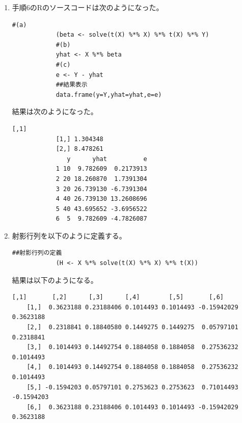 \documentclass[12pt]{jarticle}
\begin{document}
\begin{enumerate}
\begin{lstlisting}[style = lstR]
            #(c)
            xSSD <- sum((X[,2]-xbar)^2)
            #(d)
            ySSD <- sum((Y-ybar)^2)
            ##結果表示
            data.frame(x.SSD = xSSD, y.SSD = ySSD)
\end{lstlisting}
          結果は次のようになった。
          \begin{lstlisting}[style=log]
              x.mean y.mean
            1    2.5   22.5
              x.SSD  y.SSD
            1  11.5 1087.5
          \end{lstlisting}
    \item 手順6のRのソースコードは次のようになった。
          \begin{lstlisting}[style = lstR]
            #(a)
            (beta <- solve(t(X) %*% X) %*% t(X) %*% Y)
            #(b)
            yhat <- X %*% beta 
            #(c)
            e <- Y - yhat
            ##結果表示
            data.frame(y=Y,yhat=yhat,e=e)
\end{lstlisting}
          結果は次のようになった。
          \begin{lstlisting}[style=log]
                     [,1]
            [1,] 1.304348
            [2,] 8.478261
               y      yhat          e
            1 10  9.782609  0.2173913
            2 20 18.260870  1.7391304
            3 20 26.739130 -6.7391304
            4 40 26.739130 13.2608696
            5 40 43.695652 -3.6956522
            6  5  9.782609 -4.7826087
      \end{lstlisting}
    \item 射影行列を以下のように定義する。
          \begin{lstlisting}[style = lstR]
            ##射影行列の定義
            (H <- X %*% solve(t(X) %*% X) %*% t(X))
\end{lstlisting}
          結果は以下のようになる。
          \begin{lstlisting}[style=log]
               [,1]       [,2]      [,3]      [,4]        [,5]       [,6]
    [1,]  0.3623188 0.23188406 0.1014493 0.1014493 -0.15942029  0.3623188
    [2,]  0.2318841 0.18840580 0.1449275 0.1449275  0.05797101  0.2318841
    [3,]  0.1014493 0.14492754 0.1884058 0.1884058  0.27536232  0.1014493
    [4,]  0.1014493 0.14492754 0.1884058 0.1884058  0.27536232  0.1014493
    [5,] -0.1594203 0.05797101 0.2753623 0.2753623  0.71014493 -0.1594203
    [6,]  0.3623188 0.23188406 0.1014493 0.1014493 -0.15942029  0.3623188
    \end{lstlisting}
          \clearpage
          \begin{itemize}

\end{itemize}
\end{enumerate}
\end{document}
